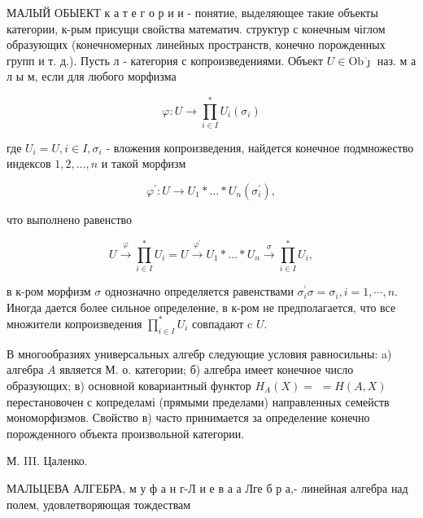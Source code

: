 \documentclass[10pt]{article}
\begin{document}
МАЛЫЙ ОБЫЕКТ к а т е г о р и и - понятие, выделяющее такие объекты категории, к-рым присущи свойства математич. структур с конечным чіглом образующих (конечномерных линейных пространств, конечно порожденных групп и т. д.). Пусть л - категория с копроизведениями. Объект $U \in \mathrm{Ob \grave { \jmath }}$ наз. м а л ы м, если для любого морфизма



\[

\varphi: U \rightarrow \prod_{i \in I}^{*} U_{i}\left(\sigma_{i}\right)

\]



где $U_{i}=U, i \in I, \sigma_{i}$ - вложения копроизведения, найдется конечное подмножество индексов $1,2, \ldots, n$ и такой морфизм



\[

\varphi^{\prime}: U \longrightarrow U_{1} * \ldots * U_{n}\left(\sigma_{i}^{\prime}\right),

\]



что выполнено равенство



\[

U \stackrel{\varphi}{\longrightarrow} \prod_{i \in I}^{*} U_{i}=U \stackrel{\varphi^{\prime}}{\longrightarrow} U_{1} * \ldots * U_{n} \stackrel{\sigma}{\longrightarrow} \prod_{i \in I}^{*} U_{i},

\]



в к-ром морфизм $\sigma$ однозначно определяется равенствами $\sigma_{i}^{\prime} \sigma=\sigma_{i}, i=1, \cdots, n$. Иногда дается более сильное определение, в к-ром не предполагается, что все множители копроизведения $\prod_{i \in I}^{*} U_{i}$ совпадают c $U$.



В многообразиях универсальных алгебр следующие условия равносильны: a) алгебра $A$ является М. о. категории; б) алгебра имеет конечное число образующих; в) основной ковариантный функтор $H_{A}(X)=$ $=H(A, X)$ перестановочен с копределамі (прямыми пределами) направленных семейств мономорфизмов. Свойство в) часто принимается за определение конечно порожденного объекта произвольной категории.



М. III. Цаленко.



МАЛЬЦЕВА АЛГЕБРА, м у ф а н г-Л и е в а а Лге б р а,- линейная алгебра над полем, удовлетворяющая тождествам
\end{document}
